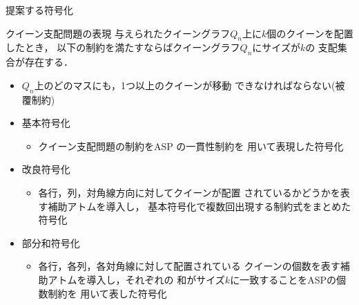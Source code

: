 \documentclass[dvipdfmx,10pt]{beamer}
\begin{document}
%
%

\begin{frame}{提案する符号化}
 \begin{block}{クイーン支配問題の表現}
  与えられたクイーングラフ$Q_n$上に$k$個のクイーンを配置したとき，
  以下の制約を満たすならばクイーングラフ$Q_{n}$にサイズが$k$の
  支配集合が存在する．
  \begin{itemize}
   \item $Q_n$上のどのマスにも，1つ以上のクイーンが移動
	 できなければならない(\alert{被覆制約})
  \end{itemize}
 \end{block}
 \begin{itemize}
  \item \alert{基本符号化}
	\begin{itemize}
	 \item クイーン支配問題の制約をASP の一貫性制約を
	       用いて表現した符号化
	\end{itemize}
  \item \alert{改良符号化} 
	\begin{itemize}
	 \item 各行，列，対角線方向に対してクイーンが配置
	       されているかどうかを表す補助アトムを導入し，
	       基本符号化で複数回出現する制約式をまとめた符号化
	\end{itemize}
  \item \alert{部分和符号化}
	\begin{itemize}
	  \item 各行，各列，各対角線に対して配置されている
		クイーンの個数を表す補助アトムを導入し，それぞれの
		和がサイズ$k$に一致することをASPの個数制約を
		用いて表した符号化
	\end{itemize}
 \end{itemize}
\end{frame}

%
%
 
\end{document}
